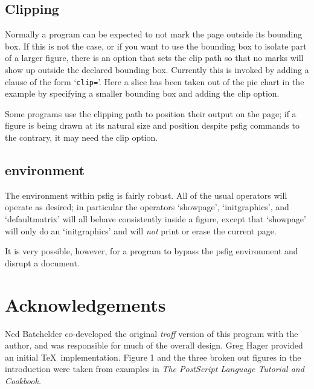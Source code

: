 \subsection{Clipping}
Normally a \Ps program can be expected to not mark the page 
outside its bounding box. If this is not the case, or if you
want to use the bounding box to isolate part of a larger figure,
there is an option that sets the \Ps clip path so that
no marks will show up outside the declared bounding box. Currently
this is invoked by adding a clause of the form `{\tt clip=}'.
Here a slice has been taken out of the pie chart in the example by
specifying a smaller bounding box and adding the clip option.
\par
\centerline{}
\par
Some \Ps programs use the clipping path to position their output on
the page; if a figure is being drawn at its natural size and position
despite psfig commands to the contrary, it may need the clip option.
\par
\subsection{\Ps environment}
The \Ps environment within psfig is fairly robust. All of the
usual \Ps operators will operate as desired; in particular 
the operators `showpage', `initgraphics', and `defaultmatrix' will
all behave consistently inside a figure, except that `showpage' will
only do an `initgraphics' and will {\it not} print or erase the current
page.
\par 
It is very possible, however, for a \Ps program to bypass the psfig
environment and disrupt a document. 
\par
\section{Acknowledgements}
\par
Ned Batchelder co-developed the original {\it troff} version of this
program with the author, and was responsible for much of the overall design.
Greg Hager provided an initial \TeX\ implementation.
Figure 1 and the three broken out figures in 
the introduction were taken from examples in {\it The PostScript Language
Tutorial and Cookbook.} 
\par 
\appendix
\newpage
